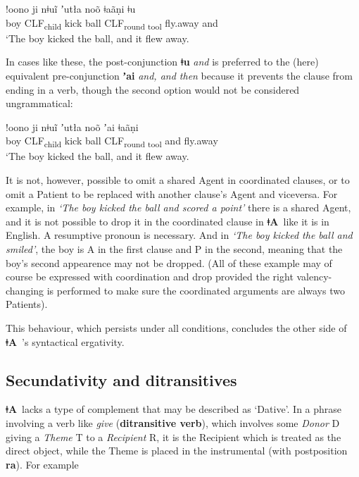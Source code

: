 \documentclass[11pt]{book}
\newcommand{\qcn}[1]{\textbf{#1}}
\newcommand{\langname}{\qcn{ǂA}~}
\newcommand{\transl}[2]{\qcn{#1} \emph{#2}}
\newcommand{\grammsc}[1]{\textsc{#1}}
\newcommand{\CLF}[1]{\grammsc{CLF}\textsubscript{#1}}
\begin{document}
\begin{exe}
\ex
\gll !oono 	ji 	nǂuĩ 	 	ʼutła 	noõ  ǂaãṇi ǂu\\
boy 	\CLF{child} 	kick 	ball 	\CLF{round tool} 	fly.away  and\\
\glt `The boy kicked the ball, and it flew away.
\end{exe}

In cases like these, the post-conjunction \transl{ǂu}{and} is preferred to the (here) equivalent pre-conjunction \transl{ʼai}{and, and then} because it prevents the clause from ending in a verb, though the second option would not be considered ungrammatical:

\begin{exe}
\ex
\gll !oono 	ji 	nǂuĩ 	 	ʼutła 	noõ  ʼai ǂaãṇi \\
boy 	\CLF{child} 	kick 	ball 	\CLF{round tool}   and	fly.away  \\
\glt `The boy kicked the ball, and it flew away.
\end{exe}

It is not, however, possible to omit a shared Agent in coordinated clauses, or to omit a Patient to be replaced with another clause's Agent and viceversa. For example, in \emph{`The boy kicked the ball and scored a point'} there is a shared Agent, and it is not possible to drop it in the coordinated clause in \langname like it is in English. A resumptive pronoun is necessary. And in \emph{`The boy kicked the ball and smiled'}, the boy is A in the first clause and P in the second, meaning that the boy's second appearence may not be dropped. (All of these example may of course be expressed with coordination and drop provided the right valency-changing is performed to make sure the coordinated arguments are always two Patients).

This behaviour, which persists under all conditions, concludes the other side of \langname's syntactical ergativity.

\subsection{Secundativity and ditransitives}

\langname lacks a type of complement that may be described as `Dative'. In a phrase involving a verb like \emph{give} (\textbf{ditransitive verb}), which involves some \emph{Donor} D giving a \emph{Theme} T to a \emph{Recipient} R, it is the Recipient which is treated as the direct object, while the Theme is placed in the instrumental (with postposition \qcn{ra}). For example
\end{document}
